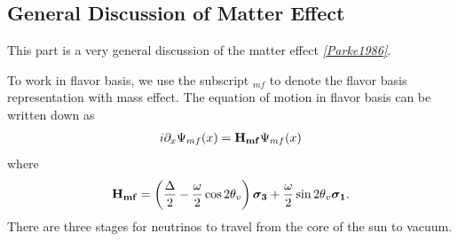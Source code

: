 \documentclass[letterpaper,12pt,english]{sphinxmanual}
\begin{document}
\subsection{General Discussion of Matter Effect}
\label{msw:general-discussion-of-matter-effect}
This part is a very general discussion of the matter effect \label{msw:id1}{\hyperref[msw:parke1986]{\emph{{[}Parke1986{]}}}}.

To work in flavor basis, we use the subscript \({}_{mf}\) to denote the flavor basis representation with mass effect. The equation of motion in flavor basis can be written down as
\begin{gather}
\begin{split}i\partial_x \Psi_{mf}(x) = \mathbf{H_{mf}} \Psi_{mf}(x)\end{split}\notag
\end{gather}
where
\begin{gather}
\begin{split}\mathbf{H_{mf}} =  \left(  \frac{\Delta}{2} -  \frac{\omega}{2} \cos 2\theta_v  \right) \boldsymbol{\sigma_3} + \frac{\omega}{2} \sin 2\theta_v \boldsymbol{\sigma_1}.\end{split}\notag
\end{gather}
There are three stages for neutrinos to travel from the core of the sun to vacuum.
\end{document}
